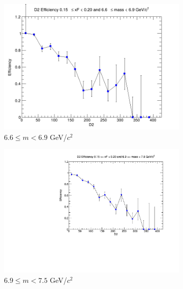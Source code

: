 \documentclass[11pt]{article}
\begin{document}
\begin{figure}[p]
\begin{subfigure}[b]{0.32\textwidth}
        \includegraphics[width=\textwidth]{./kTrackerEfficiencyPlots/D2_Efficiency_xF3_mass8.png}
        \caption{$6.6 \leq m < 6.9$ GeV/$c^2$}
    \end{subfigure}\vspace{0.5cm}
    \begin{subfigure}[b]{0.32\textwidth}
        \centering
        \includegraphics[width=\textwidth]{./kTrackerEfficiencyPlots/D2_Efficiency_xF3_mass9.pdf}
        \caption{$6.9 \leq m < 7.5$ GeV/$c^2$}
    \end{subfigure}\hfill
    \begin{subfigure}[b]{0.32\textwidth}
        \centering

\end{subfigure}
\end{figure}
\end{document}
